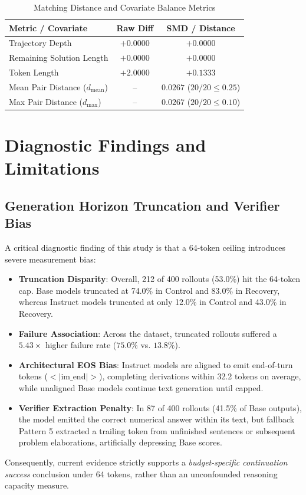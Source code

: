 \documentclass[conference]{IEEEtran}
\begin{document}
\begin{table}[htbp]
\caption{Matching Distance and Covariate Balance Metrics}
\label{tab:sensitivity}
\centering
\begin{tabularx}{\columnwidth}{Xcc}
\toprule
\textbf{Metric / Covariate} & \textbf{Raw Diff} & \textbf{SMD / Distance} \\
\midrule
Trajectory Depth & $+0.0000$ & $+0.0000$ \\
Remaining Solution Length & $+0.0000$ & $+0.0000$ \\
Token Length & $+2.0000$ & $+0.1333$ \\
\midrule
Mean Pair Distance ($d_{\text{mean}}$) & -- & $0.0267$ ($20/20 \le 0.25$) \\
Max Pair Distance ($d_{\max}$) & -- & $0.0267$ ($20/20 \le 0.10$) \\
\bottomrule
\end{tabularx}
\end{table}

\section{Diagnostic Findings and Limitations}

\subsection{Generation Horizon Truncation and Verifier Bias}
A critical diagnostic finding of this study is that a 64-token ceiling introduces severe measurement bias:
\begin{itemize}
    \item \textbf{Truncation Disparity}: Overall, 212 of 400 rollouts (53.0\%) hit the 64-token cap. Base models truncated at 74.0\% in Control and 83.0\% in Recovery, whereas Instruct models truncated at only 12.0\% in Control and 43.0\% in Recovery.
    \item \textbf{Failure Association}: Across the dataset, truncated rollouts suffered a $5.43\times$ higher failure rate ($75.0\%$ vs. $13.8\%$).
    \item \textbf{Architectural EOS Bias}: Instruct models are aligned to emit end-of-turn tokens ($<|\text{im\_end}|>$), completing derivations within 32.2 tokens on average, while unaligned Base models continue text generation until capped.
    \item \textbf{Verifier Extraction Penalty}: In 87 of 400 rollouts (41.5\% of Base outputs), the model emitted the correct numerical answer within its text, but fallback Pattern 5 extracted a trailing token from unfinished sentences or subsequent problem elaborations, artificially depressing Base scores.
\end{itemize}
Consequently, current evidence strictly supports a \textit{budget-specific continuation success} conclusion under 64 tokens, rather than an unconfounded reasoning capacity measure.
\end{document}
